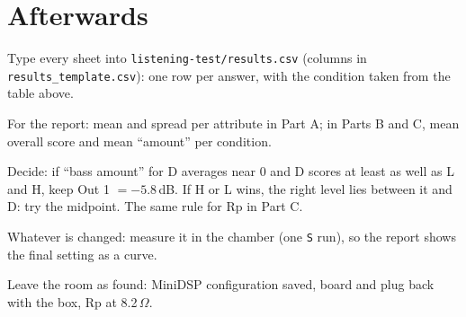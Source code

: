 \documentclass[11pt,a4paper]{article}
\begin{document}
\section{Afterwards}
\begin{chk}
\item Type every sheet into \texttt{listening-test/results.csv} (columns in \texttt{results\_template.csv}): one row per answer, with the condition taken from the table above.
\item For the report: mean and spread per attribute in Part A; in Parts B and C, mean overall score and mean ``amount'' per condition.
\item Decide: if ``bass amount'' for D averages near 0 and D scores at least as well as L and H, keep Out 1 $=-5.8$\,dB. If H or L wins, the right level lies between it and D: try the midpoint. The same rule for Rp in Part C.
\item Whatever is changed: measure it in the chamber (one \texttt{S} run), so the report shows the final setting as a curve.
\item Leave the room as found: MiniDSP configuration saved, board and plug back with the box, Rp at 8.2\,$\Omega$.
\end{chk}
\end{document}
